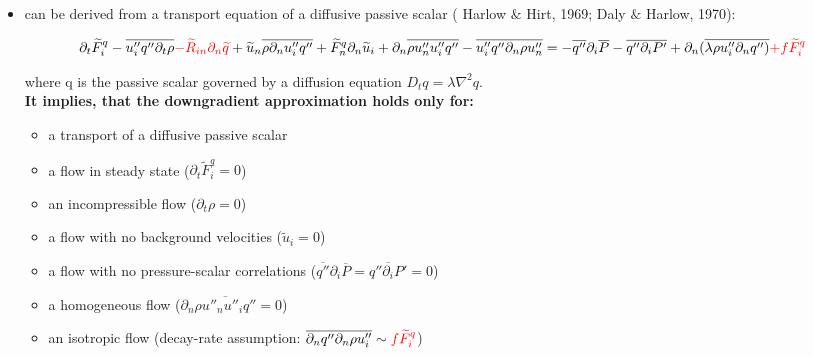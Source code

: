 \documentclass[10pt,paper=a4]{report}
\newcommand{\eht}{\overline}
\newcommand{\fht}{\widetilde}
\begin{document}
\begin{itemize}
\item can be derived from a transport equation of a diffusive passive scalar ({\color{blue} Harlow $\&$ Hirt, 1969; Daly $\&$ Harlow, 1970}):

\begin{align}
\partial_t \fht{F}_i^q  - \eht{u''_i q''\partial_t \rho} {\color{red}- \fht{R}_{in}\partial_n \fht{q}} + \fht{u}_n \eht{\rho \partial_n u''_i q''} + \fht{F}_n^q \partial_n \fht{u}_i + \partial_n \eht{\rho u''_n u''_i q''} - \eht{u''_iq''\partial_n \rho u''_n} = -\eht{q''}\partial_i \eht{P} - \eht{q''\partial_i P'} + \partial_n (\eht{\lambda \rho u''_i \partial_n q'')} {\color{red}+ f \fht{F}_i^q} \nonumber 
\end{align}

where q is the passive scalar governed by a diffusion equation $D_t q = \lambda \nabla^2 q$. \\

{\bf It implies, that the downgradient approximation holds only for:}

\begin{itemize} 
\item a transport of a diffusive passive scalar
\item a flow in steady state ($\partial_t \fht{F}_i^q = 0$)
\item an incompressible flow ($\partial_t \rho = 0$)
\item a flow with no background velocities ($\fht{u}_i = 0$)
\item a flow with no pressure-scalar correlations ($\eht{q''}\partial_i \eht{P} = \eht{q''\partial_i P'} = 0$)
\item a homogeneous flow ($\partial_n \eht{\rho u''_n u''_i q''} = 0$) 
\item an isotropic flow (decay-rate assumption: $\overline{\partial_n q'' \partial_n \rho u''_i} \sim {\color{red} f \fht{F}_i^q}$) 
\end{itemize}




\end{itemize}
\end{document}
